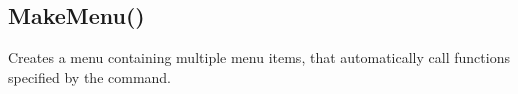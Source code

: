 \documentclass[letterpaper,10pt,english]{sphinxmanual}
\begin{document}
\subsection{MakeMenu()}
\label{\detokenize{reference/ui:makemenu}}\label{\detokenize{reference/ui:index-15}}
\sphinxAtStartPar
{}

\sphinxAtStartPar
{}

\sphinxAtStartPar
Creates a menu containing multiple menu items, that automatically call functions specified by the command.

\sphinxAtStartPar
{}

\begin{sphinxVerbatim}[commandchars=\\\{\}]
\end{sphinxVerbatim}

\sphinxAtStartPar
{}
\end{document}
